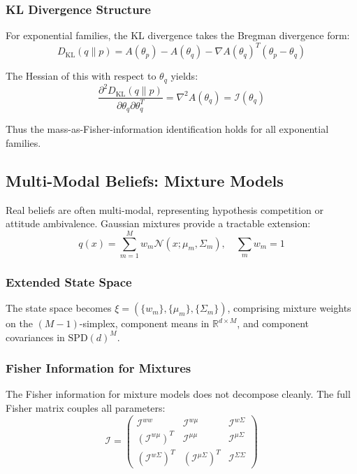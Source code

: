 \documentclass[12pt]{article}
\begin{document}
\subsubsection{KL Divergence Structure}

For exponential families, the KL divergence takes the Bregman divergence form:
\begin{equation}
D_{\mathrm{KL}}(q \| p) = A(\theta_p) - A(\theta_q) - \nabla A(\theta_q)^T(\theta_p - \theta_q)
\end{equation}

The Hessian of this with respect to $\theta_q$ yields:
\begin{equation}
\frac{\partial^2 D_{\mathrm{KL}}(q \| p)}{\partial \theta_q \partial \theta_q^T} = \nabla^2 A(\theta_q) = \mathcal{I}(\theta_q)
\end{equation}

Thus the mass-as-Fisher-information identification holds for all exponential families.

\subsection{Multi-Modal Beliefs: Mixture Models}

Real beliefs are often multi-modal, representing hypothesis competition or attitude ambivalence. Gaussian mixtures provide a tractable extension:
\begin{equation}
q(x) = \sum_{m=1}^M w_m \mathcal{N}(x; \mu_m, \Sigma_m), \quad \sum_m w_m = 1
\end{equation}

\subsubsection{Extended State Space}

The state space becomes $\xi = (\{w_m\}, \{\mu_m\}, \{\Sigma_m\})$, comprising mixture weights on the $(M-1)$-simplex, component means in $\mathbb{R}^{d \times M}$, and component covariances in $\mathrm{SPD}(d)^M$.

\subsubsection{Fisher Information for Mixtures}

The Fisher information for mixture models does not decompose cleanly. The full Fisher matrix couples all parameters:
\begin{equation}
\mathcal{I} = \begin{pmatrix} \mathcal{I}^{ww} & \mathcal{I}^{w\mu} & \mathcal{I}^{w\Sigma} \\ (\mathcal{I}^{w\mu})^T & \mathcal{I}^{\mu\mu} & \mathcal{I}^{\mu\Sigma} \\ (\mathcal{I}^{w\Sigma})^T & (\mathcal{I}^{\mu\Sigma})^T & \mathcal{I}^{\Sigma\Sigma} \end{pmatrix}
\end{equation}
\end{document}
